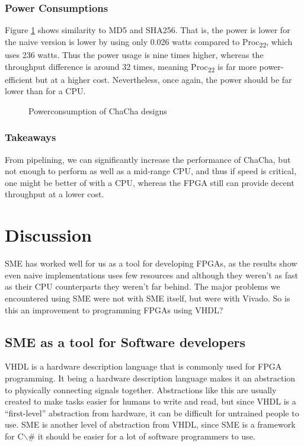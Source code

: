 \documentclass[a4paper, openany]{book}
\begin{document}
\begin{abstact}
\subsection{Power Consumptions}
\label{sec:orgaaf2ec0}
Figure \ref{fig:ChaCha_power} shows similarity to MD5 and SHA256. That is, the power is lower for the naive version is lower by using only 0.026 watts compared to Proc\textsubscript{22}, which uses 236 watts. Thus the power usage is nine times higher, whereas the throughput difference is around 32 times, meaning Proc\textsubscript{22} is far more power-efficient but at a higher cost. Nevertheless, once again, the power should be far lower than for a CPU.

\begin{figure}[H]
\centering
{}
\caption[Power consumption of ChaCha20 designs]
{Powerconsumption of ChaCha designs}
\label{fig:ChaCha_power}
\end{figure}
\subsection{Takeaways}
\label{sec:org66902d8}
From pipelining, we can significantly increase the performance of ChaCha, but not enough to perform as well as a mid-range CPU, and thus if speed is critical, one might be better of with a CPU, whereas the FPGA still can provide decent throughput at a lower cost.

\chapter{Discussion}
\label{sec:org368111a}
SME has worked well for us as a tool for developing FPGAs, as the results show even naive implementations uses few resources
and although they weren't as fast as their CPU counterparts they weren't far behind. The major problems we encountered using SME were not with SME itself,
but were with Vivado. So is this an improvement to programming FPGAs using VHDL?

\section{SME as a tool for Software developers}
\label{sec:org48ad13e}
VHDL is a hardware description language that is commonly used for FPGA programming.
It being a hardware description language makes it an abstraction to physically connecting signals together.
Abstractions like this are usually created to make tasks easier for humans to write and read,
but since VHDL is a ``first-level'' abstraction from hardware, it can be difficult for untrained people to use.
SME is another level of abstraction from VHDL, since SME is a framework for C$\backslash$# it should be easier for a lot of software programmers to use.


\end{abstact}
\end{document}
